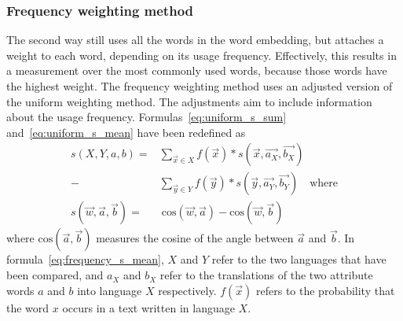 \subsubsection{Frequency weighting method}
\label{method:2}
The second way still uses all the words in the word embedding, but attaches a weight to
each word, depending on its usage frequency. Effectively, this results in a measurement
over the most commonly used words, because those words have the highest weight.
The frequency weighting method uses an adjusted version of the uniform weighting method.
The adjustments aim to include information about the usage frequency.
Formulas~\eqref{eq:uniform_s_sum} and~\eqref{eq:uniform_s_mean} have been redefined
as
\begin{align} 
s(X,Y,a,b) =& \displaystyle\sum_{\vec{x} \in X}\! f(\vec{x})*s(\vec{x},\vec{a_X},\vec{b_X})
    \nonumber \\
-& \displaystyle\sum_{\vec{y} \in Y}\! f(\vec{y})\! *\! s(\vec{y},\vec{a_Y},\vec{b_Y})
    \quad\text{where} \nonumber \\
\label{eq:frequency_s_mean}
s(\vec{w},\vec{a},\vec{b}) =&\ \text{cos}(\vec{w}, \vec{a}) - \text{cos}(\vec{w}, \vec{b})
\end{align}
where $\text{cos}(\vec{a}, \vec{b})$ measures the cosine of the angle between
$\vec{a}$ and $\vec{b}$. 
In formula~\eqref{eq:frequency_s_mean}, $X$ and $Y$ refer to the two languages that have
been compared, and $a_X$ and $b_X$ refer to the translations of the
two attribute words $a$ and $b$ into language $X$ respectively. 
$f(\vec{x})$ refers to the probability that the word $x$ occurs in a text written
in language $X$.

